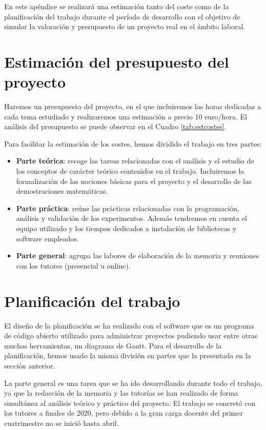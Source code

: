 En este apéndice se realizará una estimación tanto del coste como de la planificación del trabajo durante el período de desarrollo con el objetivo de simular la valoración y presupuesto de un proyecto real en el ámbito laboral.

\section{Estimación del presupuesto del proyecto}

Haremos un presupuesto del proyecto, en el que incluiremos las horas dedicadas a cada tema estudiado y realizaremos una estimación a precio 10 euro/hora. El análisis del presupuesto se puede observar en el Cuadro \ref{tab:estcostes}.

Para facilitar la estimación de los costes, hemos dividido el trabajo en tres partes:

\begin{itemize}
    \item \textbf{Parte teórica}: recoge las tareas relacionadas con el análisis y el estudio de los conceptos de carácter teórico contenidos en el trabajo. Incluiremos la formalización de las nociones básicas para el proyecto y el desarrollo de las demostraciones matemáticas.
    \item \textbf{Parte práctica}: reúne las prácticas relacionadas con la programación, análisis y validación de los experimentos. Además tendremos en cuenta el equipo utilizado y los tiempos dedicados a instalación de bibliotecas y software empleados.
    \item \textbf{Parte general}: agrupa las labores de elaboración de la memoria y reuniones con los tutores (presencial u online).
\end{itemize}

\section{Planificación del trabajo}

El diseño de la planificación se ha realizado con el software \cite{ganttproject} que es un programa de código abierto utilizado para administrar proyectos pudiendo usar entre otras muchas herramientas, un diagrama de Gantt. Para el desarrollo de la planificación, hemos usado la misma división en partes que la presentada en la sección anterior.

\clearpage

La parte general es una tarea que se ha ido desarrollando durante todo el trabajo, ya que la redacción de la memoria y las tutorías se han realizado de forma simultánea al análisis teórico y práctico del proyecto. El trabajo se concretó con los tutores a finales de 2020, pero debido a la gran carga docente del primer cuatrimestre no se inició hasta abril. 

